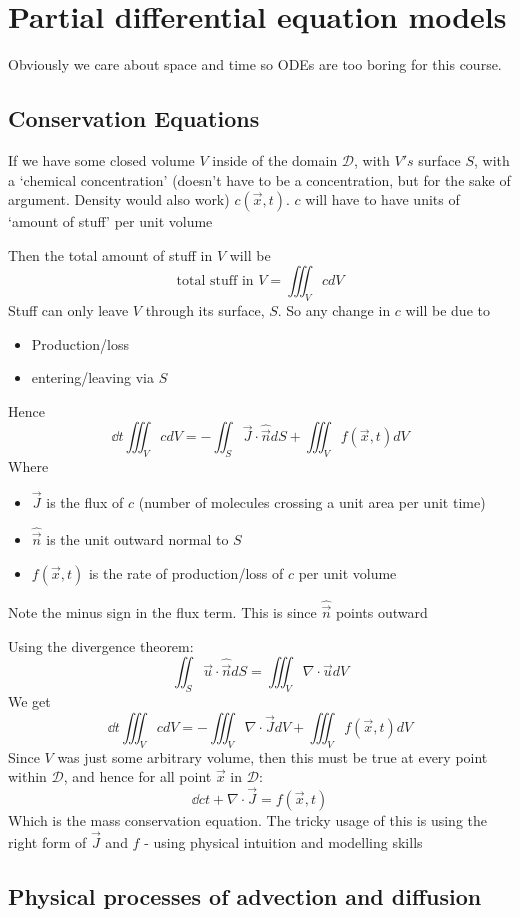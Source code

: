 \documentclass{X:/Documents/Coding/Latex/myassignment}
\begin{document}
\section{Partial differential equation models}
Obviously we care about space and time so ODEs are too boring for this course.

\subsection{Conservation Equations}
If we have some closed volume $V$ inside of the domain $\mathcal{D}$, with $V's$ surface $S$, with a `chemical concentration' (doesn't have to be a concentration, but for the sake of argument. Density would also work) $c(\vec x,t)$. $c$ will have to have units of `amount of stuff' per unit volume

Then the total amount of stuff in $V$ will be
\[\text{total stuff in }V = \iiint_{V} c dV \]
Stuff can only leave $V$ through its surface, $S$. So any change in $c$ will be due to
\begin{itemize}
	\item Production/loss
	\item entering/leaving via $S$
\end{itemize}
Hence
\[\dd{}t \iiint_V cdV = - \iint_S \vec J \cdot \hat{\vec n} dS + \iiint_V f(\vec x,t) dV\]
Where
\begin{itemize}
	\item $\vec J$ is the flux of $c$ (number of molecules crossing a unit area per unit time)
	\item $\hat{\vec n}$ is the unit outward normal to $S$
	\item $f(\vec x,t)$ is the rate of production/loss of $c$ per unit volume
\end{itemize}
Note the minus sign in the flux term. This is since $\hat{\vec n}$ points outward

Using the divergence theorem:
\[\iint_S \vec u \cdot \hat{\vec n} dS = \iiint_V \nabla \cdot \vec u dV\]
We get
\[\dd{}t \iiint_V cdV = - \iiint_V \nabla \cdot \vec J  dV+ \iiint_V f(\vec x,t) dV\]
Since $V$ was just some arbitrary volume, then this must be true at every point within $\mathcal{D}$, and hence for all point $\vec x$ in $\mathcal{D}$:
\[\dd ct + \nabla \cdot \vec J = f(\vec x,t)\]
Which is the mass conservation equation.
The tricky usage of this is using the right form of $\vec J$ and $f$ - using physical intuition and modelling skills

\subsection{Physical processes of advection and diffusion}
\end{document}
